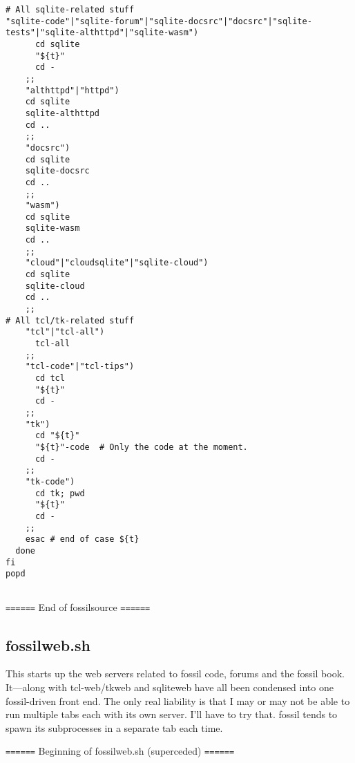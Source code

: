 \documentclass[11pt]{article}
\begin{document}
\begin{verbatim}
# All sqlite-related stuff
"sqlite-code"|"sqlite-forum"|"sqlite-docsrc"|"docsrc"|"sqlite-tests"|"sqlite-althttpd"|"sqlite-wasm") 
      cd sqlite
      "${t}"
      cd -
    ;;
    "althttpd"|"httpd") 
	cd sqlite
	sqlite-althttpd
	cd ..
    ;;
    "docsrc")
	cd sqlite
	sqlite-docsrc
	cd ..
    ;;
    "wasm")
	cd sqlite
	sqlite-wasm
	cd ..
    ;;
    "cloud"|"cloudsqlite"|"sqlite-cloud")
	cd sqlite
	sqlite-cloud
	cd ..
    ;;
# All tcl/tk-related stuff
    "tcl"|"tcl-all")
      tcl-all
    ;;
    "tcl-code"|"tcl-tips")
      cd tcl
      "${t}"
      cd -
    ;;
    "tk")
      cd "${t}"
      "${t}"-code  # Only the code at the moment.
      cd -
    ;;
    "tk-code") 
      cd tk; pwd
      "${t}"
      cd -
    ;;
    esac # end of case ${t}
  done
fi
popd


\end{verbatim}
\texttt{======} End of fossilsource \texttt{======}

\subsection*{fossilweb.sh}
\label{sec:orgccba62f}

This starts up the web servers related to fossil code, forums and the fossil book. It—along with tcl-web/tkweb and sqliteweb have all been condensed into one fossil-driven front end. The only real liability is that I may or may not be able to run multiple tabs each with its own server. I'll have to try that. fossil tends to spawn its subprocesses in a separate tab each time.

\texttt{======} Beginning of fossilweb.sh (superceded) \texttt{======}
\end{document}
